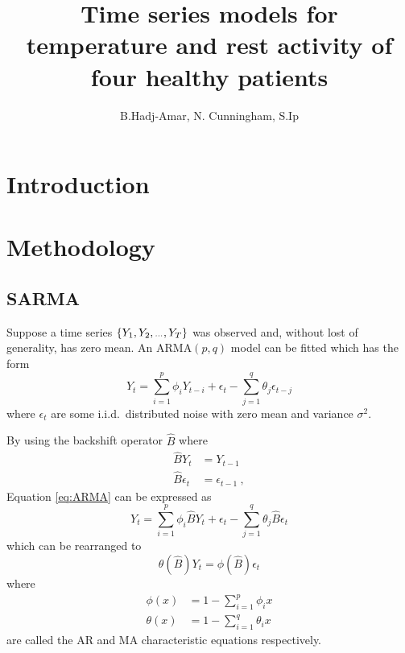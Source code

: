 \documentclass[]{article}
\title{\textbf{Time series models for temperature and rest activity of four healthy patients}}
\author{B.Hadj-Amar, N. Cunningham, S.Ip}
\newcommand{\dotdotdot}{\vphantom{.}_{\cdots}}
\newcommand{\backshift}{\widehat{B}}
\begin{document}
\maketitle

\begin{abstract}

\end{abstract}

\section{Introduction}

\section{Methodology}
\subsection{SARMA}
Suppose a time series $\{Y_1,Y_2,\dotdotdot,Y_T\}$ was observed and, without lost of generality, has zero mean. An ARMA$(p,q)$ model can be fitted which has the form
\begin{equation}
Y_t = \sum_{i=1}^{p} \phi_i Y_{t-i} + \epsilon_t - \sum_{j=1}^{q} \theta_{j} \epsilon_{t-j}
\label{eq:ARMA}
\end{equation}
where $\epsilon_t$ are some i.i.d.~distributed noise with zero mean and variance $\sigma^2$.

By using the backshift operator $\backshift$ where
\begin{align*}
\backshift Y_t &= Y_{t-1} \\
\backshift \epsilon_t &= \epsilon_{t-1} \ ,
\end{align*}
Equation \eqref{eq:ARMA} can be expressed as
\begin{equation*}
Y_t = \sum_{i=1}^{p} \phi_i \backshift Y_{t} + \epsilon_t - \sum_{j=1}^{q} \theta_{j} \backshift \epsilon_{t}
\end{equation*}
which can be rearranged to
\begin{equation*}
\theta\left(\backshift\right)Y_t=\phi\left(\backshift\right)\epsilon_t
\end{equation*}
where
\begin{align*}
\phi(x)&=1-\sum_{i=1}^{p} \phi_i x \\
\theta(x)&=1-\sum_{i=1}^{q} \theta_i x
\end{align*}
are called the AR and MA characteristic equations respectively.
\end{document}

